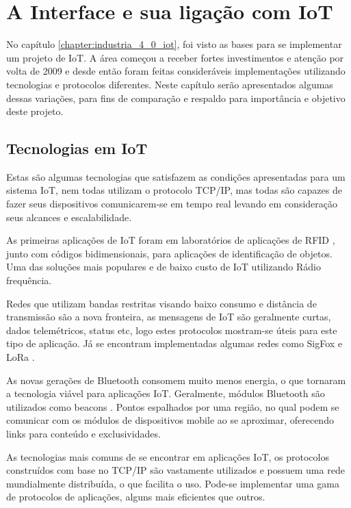 \chapter{A Interface e sua ligação com IoT}
\label{chapter:interface_iot}

No capítulo \ref{chapter:industria_4_0_iot}, foi visto as bases para se implementar um projeto de IoT. A área começou a receber fortes investimentos e atenção por volta de 2009 e desde então foram feitas consideráveis implementações utilizando tecnologias e protocolos diferentes. Neste capítulo serão apresentados algumas dessas variações, para fins de comparação e respaldo para importância e objetivo deste projeto.

\section{Tecnologias em IoT}
\label{section:tecnologias_iot}

Estas são algumas tecnologias que satisfazem as condições apresentadas para um sistema IoT, nem todas utilizam o protocolo TCP/IP, mas todas são  capazes de fazer seus dispositivos comunicarem-se em tempo real levando em consideração seus alcances e escalabilidade.

As primeiras aplicações de IoT foram em laboratórios de aplicações de RFID \cite{Rampim:iot}, junto com códigos bidimensionais, para aplicações de identificação de objetos. Uma das soluções mais populares e de baixo custo de IoT utilizando Rádio frequência.

Redes que utilizam bandas restritas visando baixo consumo e distância de transmissão são a nova fronteira, as mensagens de IoT são geralmente curtas, dados telemétricos, status etc, logo estes protocolos mostram-se úteis para este tipo de aplicação. Já se encontram implementadas algumas redes como SigFox \cite{Sigfox} e LoRa \cite{LoRa}. 

As novas gerações de Bluetooth consomem muito menos energia, o que tornaram a tecnologia viável para aplicações IoT. Geralmente, módulos Bluetooth são utilizados como beacons \cite{Endeavor:Beacons}. Pontos espalhados por uma região, no qual podem se comunicar com os módulos de dispositivos mobile ao se aproximar, oferecendo links para conteúdo e exclusividades.

As tecnologias mais comuns de se encontrar em aplicações IoT, os protocolos construídos com base no TCP/IP são vastamente utilizados e possuem uma rede mundialmente distribuída, o que facilita o uso. Pode-se implementar uma gama de protocolos de aplicações, alguns mais eficientes que outros.

